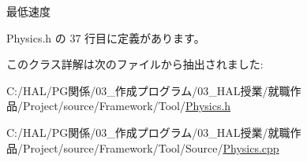 最低速度 



 Physics.\+h の 37 行目に定義があります。



このクラス詳解は次のファイルから抽出されました\+:\begin{DoxyCompactItemize}
\item 
C\+:/\+H\+A\+L/\+P\+G関係/03\+\_\+作成プログラム/03\+\_\+\+H\+A\+L授業/就職作品/\+Project/source/\+Framework/\+Tool/\mbox{\hyperlink{_physics_8h}{Physics.\+h}}\item 
C\+:/\+H\+A\+L/\+P\+G関係/03\+\_\+作成プログラム/03\+\_\+\+H\+A\+L授業/就職作品/\+Project/source/\+Framework/\+Tool/\+Source/\mbox{\hyperlink{_physics_8cpp}{Physics.\+cpp}}\end{DoxyCompactItemize}
